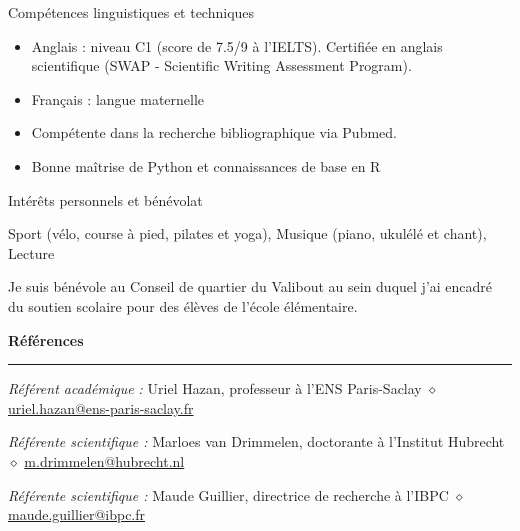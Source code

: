 \documentclass[
	10pt,
]{style} %
\renewenvironment{rReferences}
{\vspace{-0.25em}\medskip\textbf{Références}\medskip\hrule
\begin{list}{}
{\setlength{\leftmargin}{1.5em}
\setlength{\labelwidth}{0pt}
\setlength{\itemindent}{0pt}
\setlength{\labelsep}{0pt}
\setlength{\parsep}{0pt}
\setlength{\topsep}{0.3em}
\setlength{\itemsep}{0.3em}}}
{\end{list}}
\begin{document}
\begin{rSection}{Compétences linguistiques et techniques}

	\begin{itemize}[noitemsep, topsep=0pt, left=0pt]
		\item Anglais : niveau C1 (score de 7.5/9 à l'IELTS). Certifiée en anglais scientifique (SWAP - Scientific Writing Assessment Program).
		\item Français : langue maternelle
		\item Compétente dans la recherche bibliographique via Pubmed.
		\item Bonne maîtrise de Python et connaissances de base en R
	\end{itemize}

\end{rSection}



\begin{rSection}{Intérêts personnels et bénévolat}
	\vspace{-1em}
	\begin{rSubsection}{}{}{}{}
		\item Sport (vélo, course à pied, pilates et yoga), Musique (piano, ukulélé et chant), Lecture
		\item Je suis bénévole au Conseil de quartier du Valibout au sein duquel j'ai encadré du soutien scolaire pour des élèves de l'école élémentaire.
	\end{rSubsection}

\end{rSection}



\begin{rReferences}
	\item \textit{Référent académique :} Uriel Hazan, professeur à l'ENS Paris-Saclay $\diamond$ \href{mailto:uriel.hazan@ens-paris-saclay.fr}{uriel.hazan@ens-paris-saclay.fr}
	\item \textit{Référente scientifique :} Marloes van Drimmelen, doctorante à l'Institut Hubrecht $\diamond$ \href{mailto:m.drimmelen@hubrecht.nl}{m.drimmelen@hubrecht.nl}
	\item \textit{Référente scientifique :} Maude Guillier, directrice de recherche à l'IBPC $\diamond$ \href{mailto:maude.guillier@ibpc.fr}{maude.guillier@ibpc.fr}
\end{rReferences}
\end{document}

